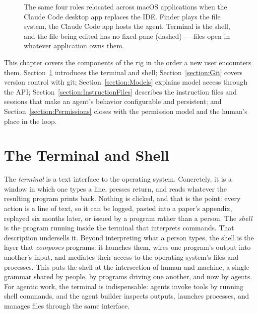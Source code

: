 \begin{figure}[t]
\centering
{\rigfigurefonts}
\caption{The same four roles relocated across macOS applications when the Claude Code desktop app replaces the IDE.
Finder plays the file system, the Claude Code app hosts the agent, Terminal is the shell, and the file being edited has no fixed pane (dashed) --- files open in whatever application owns them.}
\label{figure:ClaudeCodeAppLayout}
\end{figure}

This chapter covers the components of the rig in the order a new user encounters them.
Section~\ref{section:Terminal} introduces the terminal and shell; Section~\ref{section:Git} covers version control with git; Section~\ref{section:Models} explains model access through the API; Section~\ref{section:InstructionFiles} describes the instruction files and sessions that make an agent's behavior configurable and persistent; and Section~\ref{section:Permissions} closes with the permission model and the human's place in the loop.

\section{The Terminal and Shell}
\label{section:Terminal}

The \emph{terminal} is a text interface to the operating system.
Concretely, it is a window in which one types a line, presses return, and reads whatever the resulting program prints back.
Nothing is clicked, and that is the point: every action is a line of text, so it can be logged, pasted into a paper's appendix, replayed six months later, or issued by a program rather than a person.
The \emph{shell} is the program running inside the terminal that interprets commands.
That description undersells it.
Beyond interpreting what a person types, the shell is the layer that \emph{composes} programs: it launches them, wires one program's output into another's input, and mediates their access to the operating system's files and processes.
This puts the shell at the intersection of human and machine, a single grammar shared by people, by programs driving one another, and now by agents.
For agentic work, the terminal is indispensable: agents invoke tools by running shell commands, and the agent builder inspects outputs, launches processes, and manages files through the same interface.


